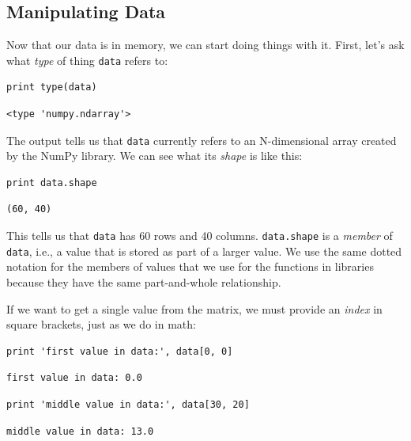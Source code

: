 \documentclass[]{book}
\newcommand{\gdef}[2]{\emph{#2}}
\begin{document}
\subsection{Manipulating Data}

Now that our data is in memory, we can start doing things with it.
First, let's ask what \gdef{g:data-type}{type} of thing
\texttt{data} refers to:

\begin{verbatim}
print type(data)
\end{verbatim}

\begin{verbatim}
<type 'numpy.ndarray'>
\end{verbatim}

The output tells us that \texttt{data} currently refers to an
N-dimensional array created by the NumPy library. We can see what its
\gdef{g:shape}{shape} is like this:

\begin{verbatim}
print data.shape
\end{verbatim}

\begin{verbatim}
(60, 40)
\end{verbatim}

This tells us that \texttt{data} has 60 rows and 40 columns.
\texttt{data.shape} is a \gdef{g:member}{member} of \texttt{data},
i.e., a value that is stored as part of a larger value. We use the same
dotted notation for the members of values that we use for the functions
in libraries because they have the same part-and-whole relationship.

If we want to get a single value from the matrix, we must provide an
\gdef{g:index}{index} in square brackets, just as we do in math:

\begin{verbatim}
print 'first value in data:', data[0, 0]
\end{verbatim}

\begin{verbatim}
first value in data: 0.0
\end{verbatim}

\begin{verbatim}
print 'middle value in data:', data[30, 20]
\end{verbatim}

\begin{verbatim}
middle value in data: 13.0
\end{verbatim}
\end{document}
